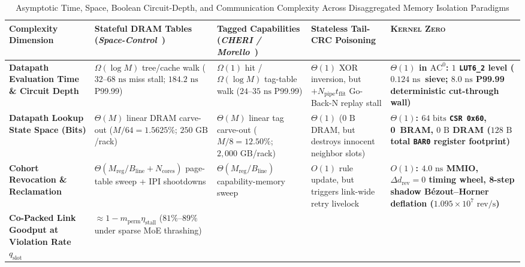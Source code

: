 \documentclass[11pt,letterpaper]{article}
\renewcommand{\arraystretch}{1.22}
\providecommand{\StageOneNs}{\ensuremath{0.124\text{~ns}}}
\providecommand{\CoreBRAM}{0}
\providecommand{\StageOneSieveDelayNs}{\StageOneNs}
\theoremstyle{spectralthm}
\begin{document}
\begin{table}[!htp]
\centering
\footnotesize
\setlength{\tabcolsep}{4.5pt}
\renewcommand{\arraystretch}{1.44}
\caption{Asymptotic Time, Space, Boolean Circuit-Depth, and Communication Complexity Across Disaggregated Memory Isolation Paradigms}
\label{tab:complexity}
\begin{tabularx}{\textwidth}{@{}>{\raggedright\hyphenpenalty=10000\arraybackslash}p{2.60cm} >{\raggedright\arraybackslash}p{2.30cm} >{\raggedright\arraybackslash}p{2.15cm} >{\raggedright\arraybackslash}p{2.65cm} >{\raggedright\arraybackslash}X@{}}
\toprule
\textbf{Complexity Dimension} & \textbf{Stateful DRAM Tables (\textit{Space-Control}~\cite{goswami2026spacecontrol})} & \textbf{Tagged Capabilities (\textit{CHERI / Morello}~\cite{watson2015cheri})} & \textbf{Stateless Tail-CRC Poisoning} & \textbf{\textsc{Kernel Zero}} \\
\midrule
\textbf{Datapath Evaluation Time \& Circuit Depth} &
$\Omega(\log M)$ tree/cache walk ($32$--$68\text{~ns}$ miss stall; $184.2\text{~ns}$ P99.99) &
$\Omega(1)$ hit / $\Omega(\log M)$ tag-table walk ($24$--$35\text{~ns}$ P99.99) &
$\Theta(1)$ XOR inversion, but $+N_{\mathrm{pipe}} t_{\mathrm{flit}}$ Go-Back-N replay stall &
\textbf{$\Theta(1)$ in $\mathrm{AC}^0$: $1$ \texttt{LUT6\_2} level (\StageOneSieveDelayNs\ sieve; $8.0\text{~ns}$ P99.99 deterministic cut-through wall)} \\
\addlinespace[7pt]
\textbf{Datapath Lookup State Space (Bits)} &
$\Theta(M)$ linear DRAM carve-out ($M/64 = 1.5625\%$; $250\text{~GB}$/rack) &
$\Theta(M)$ linear tag carve-out ($M/8 = 12.50\%$; $2,000\text{~GB}$/rack) &
$\Theta(1)$ ($0\text{~B}$ DRAM, but destroys innocent neighbor slots) &
\textbf{$\Theta(1)$: $64\text{~bits}$ \texttt{CSR 0x60}, \CoreBRAM\ BRAM, $0\text{~B}$ DRAM ($128\text{~B}$ total \texttt{BAR0} register footprint)} \\
\addlinespace[7pt]
\textbf{Cohort Revocation \& Reclamation} &
$\Theta(M_{\mathrm{reg}}/B_{\mathrm{line}} + N_{\mathrm{cores}})$ page-table sweep + IPI shootdowns &
$\Theta(M_{\mathrm{reg}}/B_{\mathrm{line}})$ capability-memory sweep~\cite{filardo2020cornucopia, filardo2024cornucopiareloaded} &
$O(1)$ rule update, but triggers link-wide retry livelock &
\textbf{$O(1)$: $4.0\text{~ns}$ MMIO, $\Delta d_{\mathrm{rev}}=0$ timing wheel, 8-step shadow B\'{e}zout--Horner deflation ($1.095\times 10^7\text{~rev/s}$)} \\
\addlinespace[7pt]
\textbf{Co-Packed Link Goodput at Violation Rate $q_{\mathrm{slot}}$} &
$\approx 1 - m_{\mathrm{perm}}\eta_{\mathrm{stall}}$ ($81\%$--$89\%$ under sparse MoE thrashing) &

\end{tabularx}
\end{table}
\end{document}
